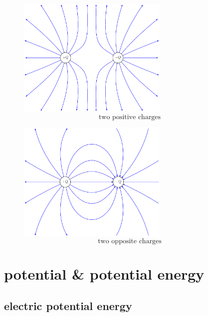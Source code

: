 
\begin{figure}
	\noindent\begin{minipage}{0.48\textwidth}
		\begin{center}
			\includegraphics[width=7.2cm]{f-lines-eq-ch.pdf}
			\begin{equation*}
			\text{two positive charges}
			\end{equation*}
		\end{center}
	\end{minipage}\hfill
	\begin{minipage}{0.48\textwidth}
		\begin{center}
			\includegraphics[width=7.2cm]{f-lines-op-ch.pdf}
			\begin{equation*}
			\text{two opposite charges} 
			\end{equation*}
		\end{center}	
	\end{minipage}
\end{figure}

\section{potential \& potential energy }

\subsection{electric potential energy}
\label{sec:electric-potential}

